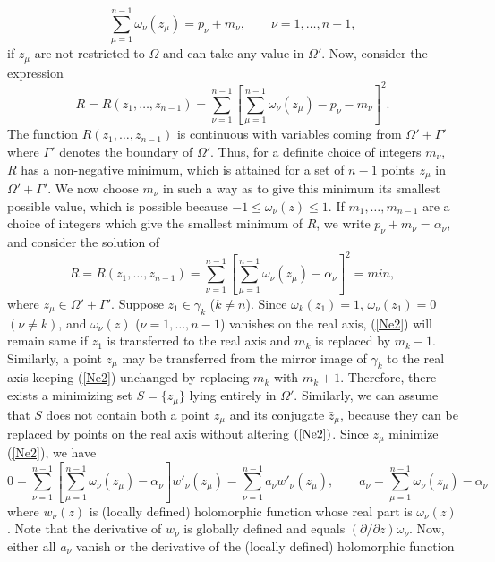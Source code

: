 \documentclass[11pt, reqno]{amsart}
\numberwithin{equation}{section}
\newcommand{\Om}{\Omega}
\begin{document}
\begin{equation}\label{Ne0}
	\sum_{\mu=1}^{n-1} \omega_{\nu}(z_{\mu}) = p_{\nu} + m_{\nu}, 
	\quad \quad \nu = 1,\ldots,n-1,
\end{equation}
if $z_{\mu}$ are not restricted to $\Om$ and can take any value in $\Omega'$. Now, consider the expression
\begin{equation}\label{Ne2}
	R = R(z_1,\ldots,z_{n-1})
	=
	\sum_{\nu =1}^{n-1}\left[\sum_{\mu=1}^{n-1} \omega_{\nu}(z_{\mu}) - p_{\nu} - m_{\nu}\right]^2.
\end{equation}
The function $R(z_1,\ldots,z_{n-1})$ is continuous with variables coming from $\Omega' + \Gamma'$ where $\Gamma'$ denotes the boundary of $\Omega'$. Thus, for a definite choice of integers $m_{\nu}$, $R$ has a non-negative minimum, which is attained for a set of $n-1$ points $z_{\mu}$ in $\Omega' + \Gamma'$. We now choose $m_{\nu}$ in such a way as to give this minimum its smallest possible value, which is possible because $-1\leq \omega_{\nu}(z)\leq 1$. If $m_1,\ldots,m_{n-1}$ are a choice of integers which give the smallest minimum of $R$, we write $p_{\nu} + m_{\nu} = \alpha_{\nu}$, and consider the solution of
\[
R = R(z_1,\ldots,z_{n-1}) 
=
\sum_{\nu =1}^{n-1}\left[\sum_{\mu=1}^{n-1} \omega_{\nu}(z_{\mu}) - \alpha_{\nu} \right]^2 = min,
\]
where $z_{\mu} \in \Omega'+\Gamma'$. Suppose $z_1\in \gamma_k$ ($k\neq n$). Since $\omega_k(z_1) = 1$, $\omega_{\nu}(z_1) = 0$ $(\nu\neq k)$, and $\omega_{\nu}(z)$ ($\nu =1,\ldots,n-1$) vanishes on the real axis, (\ref{Ne2}) will remain same if $z_1$ is transferred to the real axis and $m_k$ is replaced by $m_k-1$. Similarly, a point $z_{\mu}$ may be transferred from the mirror image of $\gamma_k$ to the real axis keeping (\ref{Ne2}) unchanged by replacing $m_k$ with $m_k + 1$. Therefore, there exists a minimizing set $S = \{z_{\mu}\}$ lying entirely in $\Om'$. Similarly, we can assume that $S$ does not contain both a point $z_{\mu}$ and its conjugate $\bar{z}_{\mu}$, because they can be replaced by points on the real axis without altering $(\ref{Ne2})$. Since $z_{\mu}$ minimize (\ref{Ne2}), we have
\[
0 =  \sum_{\nu =1}^{n-1}\left[\sum_{\mu=1}^{n-1} \omega_{\nu}(z_{\mu})-\alpha_{\nu}\right] {w'_{\nu}}(z_{\mu}) 
=
\sum_{\nu =1}^{n-1} a_{\nu} {w'_{\nu}}(z_{\mu}),
\quad \quad
a_{\nu} = \sum_{\mu=1}^{n-1} \omega_{\nu}(z_{\mu})-\alpha_{\nu}
\]
where $w_{\nu}(z)$ is (locally defined) holomorphic function whose real part is $\omega_{\nu}(z)$. Note that the derivative of $w_{\nu}$ is globally defined and equals $(\partial/\partial z) \omega_{\nu}$. Now, either all $a_{\nu}$ vanish or the derivative of the (locally defined) holomorphic function
\end{document}
